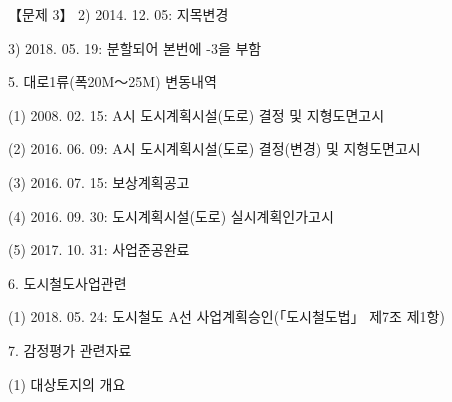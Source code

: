 \begin{longquestion}{【문제 3】}
2) 2014. 12. 05: 지목변경 \par
3) 2018. 05. 19: 분할되어 본번에 -3을 부함 \par
5. 대로1류(폭20M～25M) 변동내역 \par
\medskip\noindent (1) 2008. 02. 15: A시 도시계획시설(도로) 결정 및 지형도면고시 \par
\medskip\noindent (2) 2016. 06. 09: A시 도시계획시설(도로) 결정(변경) 및 지형도면고시 \par
\medskip\noindent (3) 2016. 07. 15: 보상계획공고 \par
\medskip\noindent (4) 2016. 09. 30: 도시계획시설(도로) 실시계획인가고시 \par
\medskip\noindent (5) 2017. 10. 31: 사업준공완료 \par
6. 도시철도사업관련 \par
\medskip\noindent (1) 2018. 05. 24: 도시철도 A선 사업계획승인(「도시철도법」 제7조 제1항) \par
7. 감정평가 관련자료 \par
\medskip\noindent (1) 대상토지의 개요 \par
{\small\centering\renewcommand{\arraystretch}{1.25}
\par}


\end{longquestion}
